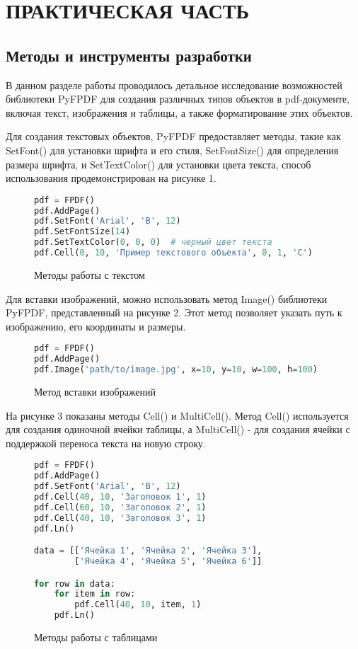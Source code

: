 \section{ПРАКТИЧЕСКАЯ ЧАСТЬ}

\subsection{Методы и инструменты разработки}

В данном разделе работы проводилось детальное исследование возможностей библиотеки PyFPDF для создания различных типов объектов в pdf-документе, включая текст, изображения и таблицы, а также форматирование этих объектов.

Для создания текстовых объектов, PyFPDF предоставляет методы, такие как SetFont() для установки шрифта и его стиля, SetFontSize() для определения размера шрифта, и SetTextColor() для установки цвета текста, способ использования продемонстрирован на рисунке 1.

\begin{figure}
\begin{lstlisting}[language=Python]
pdf = FPDF()
pdf.AddPage()
pdf.SetFont('Arial', 'B', 12)
pdf.SetFontSize(14)
pdf.SetTextColor(0, 0, 0)  # черный цвет текста
pdf.Cell(0, 10, 'Пример текстового объекта', 0, 1, 'C')
\end{lstlisting}
\caption{Методы работы с текстом}
\label{src:src1}
\end{figure} 

Для вставки изображений, можно использовать метод Image() библиотеки PyFPDF, представленный на рисунке 2. Этот метод позволяет указать путь к изображению, его координаты и размеры.

\begin{figure}
\begin{lstlisting}[language=Python]
pdf = FPDF()
pdf.AddPage()
pdf.Image('path/to/image.jpg', x=10, y=10, w=100, h=100)
\end{lstlisting}
\caption{Метод вставки изображений}
\label{src:src2}
\end{figure} 

На рисунке 3 показаны методы  Cell() и MultiCell(). Метод Cell() используется для создания одиночной ячейки таблицы, а MultiCell() - для создания ячейки с поддержкой переноса текста на новую строку. 

\begin{figure}
\begin{lstlisting}[language=Python]
pdf = FPDF()
pdf.AddPage()
pdf.SetFont('Arial', 'B', 12)
pdf.Cell(40, 10, 'Заголовок 1', 1)
pdf.Cell(60, 10, 'Заголовок 2', 1)
pdf.Cell(40, 10, 'Заголовок 3', 1)
pdf.Ln()

data = [['Ячейка 1', 'Ячейка 2', 'Ячейка 3'],
        ['Ячейка 4', 'Ячейка 5', 'Ячейка 6']]

for row in data:
    for item in row:
        pdf.Cell(40, 10, item, 1)
    pdf.Ln()

\end{lstlisting}
\caption{Методы работы с таблицами}
\label{src:src3}
\end{figure} 

